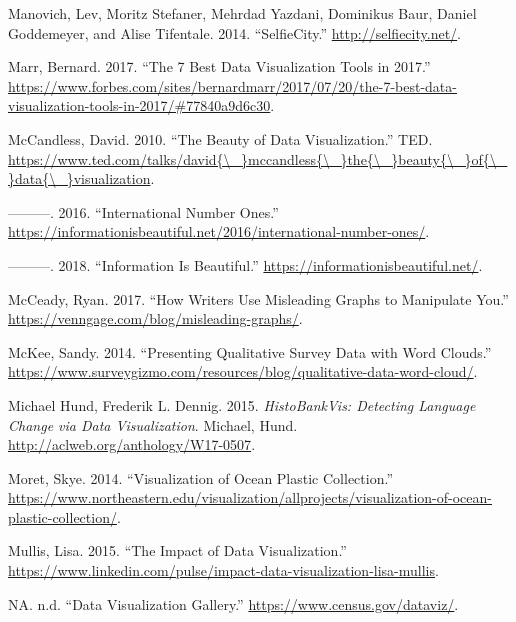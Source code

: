 \documentclass[]{book}
\begin{document}
\leavevmode\hypertarget{ref-selfie}{}%
Manovich, Lev, Moritz Stefaner, Mehrdad Yazdani, Dominikus Baur, Daniel Goddemeyer, and Alise Tifentale. 2014. ``SelfieCity.'' \url{http://selfiecity.net/}.

\leavevmode\hypertarget{ref-7_best_tools}{}%
Marr, Bernard. 2017. ``The 7 Best Data Visualization Tools in 2017.'' \url{https://www.forbes.com/sites/bernardmarr/2017/07/20/the-7-best-data-visualization-tools-in-2017/\#77840a9d6c30}.

\leavevmode\hypertarget{ref-viz_ted}{}%
McCandless, David. 2010. ``The Beauty of Data Visualization.'' TED. \href{https://www.ted.com/talks/david\%7B/_\%7Dmccandless\%7B/_\%7Dthe\%7B/_\%7Dbeauty\%7B/_\%7Dof\%7B/_\%7Ddata\%7B/_\%7Dvisualization}{https://www.ted.com/talks/david\{\textbackslash{}\_\}mccandless\{\textbackslash{}\_\}the\{\textbackslash{}\_\}beauty\{\textbackslash{}\_\}of\{\textbackslash{}\_\}data\{\textbackslash{}\_\}visualization}.

\leavevmode\hypertarget{ref-country_chart}{}%
---------. 2016. ``International Number Ones.'' \url{https://informationisbeautiful.net/2016/international-number-ones/}.

\leavevmode\hypertarget{ref-info_beautiful}{}%
---------. 2018. ``Information Is Beautiful.'' \url{https://informationisbeautiful.net/}.

\leavevmode\hypertarget{ref-writers_manipulate}{}%
McCeady, Ryan. 2017. ``How Writers Use Misleading Graphs to Manipulate You.'' \url{https://venngage.com/blog/misleading-graphs/}.

\leavevmode\hypertarget{ref-wordcloud}{}%
McKee, Sandy. 2014. ``Presenting Qualitative Survey Data with Word Clouds.'' \url{https://www.surveygizmo.com/resources/blog/qualitative-data-word-cloud/}.

\leavevmode\hypertarget{ref-lingui_data1}{}%
Michael Hund, Frederik L. Dennig. 2015. \emph{HistoBankVis: Detecting Language Change via Data Visualization}. Michael, Hund. \url{http://aclweb.org/anthology/W17-0507}.

\leavevmode\hypertarget{ref-ocean_plastic_pollution}{}%
Moret, Skye. 2014. ``Visualization of Ocean Plastic Collection.'' \url{https://www.northeastern.edu/visualization/allprojects/visualization-of-ocean-plastic-collection/}.

\leavevmode\hypertarget{ref-image_good}{}%
Mullis, Lisa. 2015. ``The Impact of Data Visualization.'' \url{https://www.linkedin.com/pulse/impact-data-visualization-lisa-mullis}.

\leavevmode\hypertarget{ref-data_viz_gallery}{}%
NA. n.d. ``Data Visualization Gallery.'' \url{https://www.census.gov/dataviz/}.
\end{document}
